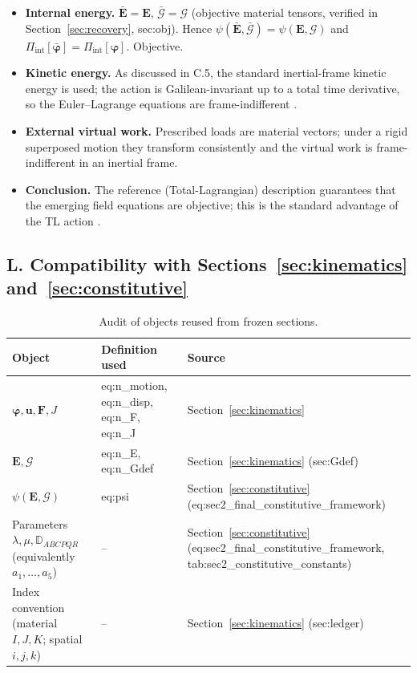 \documentclass[11pt]{article}
\begin{document}
\begin{itemize}
\item \textbf{Internal energy.} $\bar{\mathbf{E}}=\mathbf{E}$, $\bar{\bm{\mathcal{G}}}=\bm{\mathcal{G}}$ (objective material tensors, verified in Section~\ref{sec:recovery}, sec:obj). Hence $\psi(\bar{\mathbf{E}},\bar{\bm{\mathcal{G}}})=\psi(\mathbf{E},\bm{\mathcal{G}})$ and $\Pi_{\mathrm{int}}[\bar{\boldsymbol{\varphi}}]=\Pi_{\mathrm{int}}[\boldsymbol{\varphi}]$. Objective. \checkmark

\item \textbf{Kinetic energy.} As discussed in C.5, the standard inertial-frame kinetic energy is used; the action is Galilean-invariant up to a total time derivative, so the Euler--Lagrange equations are frame-indifferent \cite{Goldstein2002,MarsdenHughes1983}. \checkmark

\item \textbf{External virtual work.} Prescribed loads are material vectors; under a rigid superposed motion they transform consistently and the virtual work is frame-indifferent in an inertial frame. \checkmark

\item \textbf{Conclusion.} The reference (Total-Lagrangian) description guarantees that the emerging field equations are objective; this is the standard advantage of the TL action \cite{BonetWood2008,MarsdenHughes1983}. \checkmark
\end{itemize}

\subsection{L. Compatibility with Sections~\ref{sec:kinematics} and~\ref{sec:constitutive}}

\begin{table}[h]
\centering
\caption{Audit of objects reused from frozen sections.}
\label{tab:compat3a}
\begin{tabular}{lll}
\toprule
Object & Definition used & Source \\
\midrule
$\boldsymbol{\varphi},\mathbf{u},\mathbf{F},J$ & eq:n\_motion, eq:n\_disp, eq:n\_F, eq:n\_J & Section~\ref{sec:kinematics} \\
$\mathbf{E},\bm{\mathcal{G}}$ & eq:n\_E, eq:n\_Gdef & Section~\ref{sec:kinematics} (sec:Gdef) \\
$\psi(\mathbf{E},\bm{\mathcal{G}})$ & eq:psi & Section~\ref{sec:constitutive} (eq:sec2\_final\_constitutive\_framework) \\
Parameters $\lambda,\mu,\mathbb{D}_{ABCPQR}$ (equivalently $a_{1},\ldots,a_{5}$) & -- & Section~\ref{sec:constitutive} (eq:sec2\_final\_constitutive\_framework, tab:sec2\_constitutive\_constants) \\
Index convention (material $I,J,K$; spatial $i,j,k$) & -- & Section~\ref{sec:kinematics} (sec:ledger) \\
\bottomrule
\end{tabular}
\end{table}
\end{document}
